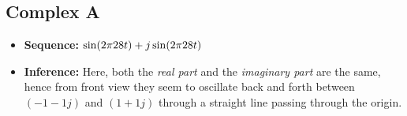 \documentclass[../../course]{subfiles}
\begin{document}
\pagebreak

\subsection{Complex A} \label{ssec:visCplxA}

\begin{itemize} [label=]

    \item \textbf{Sequence:} $\sin(2 \pi 28 t) + j \sin(2 \pi 28 t)$

    \item \textbf{Inference:} Here, both the \emph{real part} and the \emph{imaginary part}
        are the same, hence from front view they seem to oscillate back and forth between $(-1 -1j)$
        and $(1 + 1j)$ through a straight line passing through the origin.

\end{itemize}

\vfill
\end{document}
